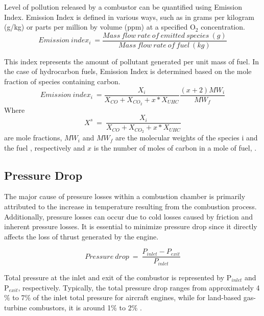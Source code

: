 Level of pollution released by a combustor can be quantified using Emission Index. Emission Index is defined in various ways, such as in grams per kilogram (g/kg) or parts per million by volume (ppm) at a specified O$_2$ concentration. 
\begin{equation}
    Emission\ index_i\ = \frac{Mass\ flow\ rate\ of\ emitted\ species\ (g)}{Mass\ flow\ rate\ of\ fuel\ (kg) }
\end{equation}

This index represents the amount of pollutant generated per unit mass of fuel. In the case of hydrocarbon fuels, Emission Index is determined based on the mole fraction of species containing carbon.
\begin{equation}
    Emission\ index_i\ = \frac{X_i}{X_{CO} + X_{CO_2} + x*X_{UHC}} \frac{(x+2)MW_i}{MW_f}
\end{equation}
Where
\begin{equation*}
    X^s \ = \ \frac{X_i}{X_{CO} + X_{CO_2} + x*X_{UHC}}
\end{equation*} are mole fractions, $MW_i$ and $MW_f$ are the molecular weights of the species i and the fuel \cite{doi:10.2514/6.2012-522}, respectively and $x$ is the number of moles of carbon in a mole of fuel, \cite{doi:10.2514/6.2013-3677}.

\subsection{Pressure Drop}
The major cause of pressure losses within a combustion chamber is primarily attributed to the increase in temperature resulting from the combustion process. Additionally, pressure losses can occur due to cold losses caused by friction and inherent pressure losses. It is essential to minimize pressure drop since it directly affects the loss of thrust generated by the engine. 

\begin{equation}
    Pressure\ drop\ = \ \frac{P_{inlet}- P_{exit}}{P_{inlet}}
\end{equation}

Total pressure at the inlet and exit of the combustor is represented by P$_{inlet}$ and P$_{exit}$, respectively. Typically, the total pressure drop ranges from approximately 4$\%$ to 7$\%$ of the inlet total pressure for aircraft engines, while for land-based gas-turbine combustors, it is around 1$\%$ to 2$\%$ \cite{GTT1996}.

